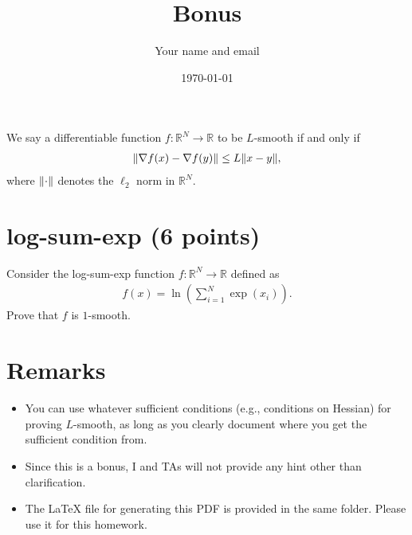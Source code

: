 \documentclass{article}
\title{Bonus}
\author{Your name and email}
\date{\today}
\newcommand{\R}{\mathbb{R}}
\begin{document}
\maketitle

We say a differentiable function $f: \R^N \to \R$ to be $L$-smooth if and only if
\begin{align}
    \norm{\nabla f(x) - \nabla f(y)} \leq L \norm{x - y},
\end{align}
where $\norm{\cdot}$ denotes the $\ell_2$ norm in $\R^N$.

\section{log-sum-exp (6 points)}
Consider the log-sum-exp function $f: \R^N \to \R$ defined as
\begin{align}
    f(x) = \ln\left(\sum_{i=1}^N\exp(x_i)\right).
\end{align}
Prove that $f$ is $1$-smooth.

\section{Remarks}

\begin{itemize}
    \item You can use whatever sufficient conditions (e.g., conditions on Hessian) for proving $L$-smooth, as long as you clearly document where you get the sufficient condition from.
    \item Since this is a bonus, I and TAs will not provide any hint other than clarification. 
    \item The \LaTeX{} file for generating this PDF is provided in the same folder. Please use it for this homework.
\end{itemize}
\end{document}
